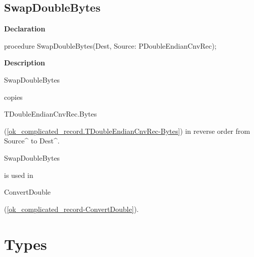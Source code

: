 \documentclass{report}
\begin{document}
\subsection*{SwapDoubleBytes}
\begin{list}{}{
\setlength{\itemindent}{0cm}
\setlength{\listparindent}{0cm}
\setlength{\leftmargin}{\evensidemargin}
\addtolength{\leftmargin}{\tmplength}
\settowidth{\labelsep}{X}
\addtolength{\leftmargin}{\labelsep}
\setlength{\labelwidth}{\tmplength}
}
\begin{flushleft}
\item[\textbf{Declaration}\hfill]
\begin{ttfamily}
procedure SwapDoubleBytes(Dest, Source: PDoubleEndianCnvRec);\end{ttfamily}


\end{flushleft}
\par
\item[\textbf{Description}]
\begin{ttfamily}SwapDoubleBytes\end{ttfamily} copies \begin{ttfamily}TDoubleEndianCnvRec.Bytes\end{ttfamily}(\ref{ok_complicated_record.TDoubleEndianCnvRec-Bytes}) in reverse order from Source{\^{}} to Dest{\^{}}.\hfill\vspace*{1ex}

 \begin{ttfamily}SwapDoubleBytes\end{ttfamily} is used in \begin{ttfamily}ConvertDouble\end{ttfamily}(\ref{ok_complicated_record-ConvertDouble}).

\end{list}
\section{Types}
\end{document}
